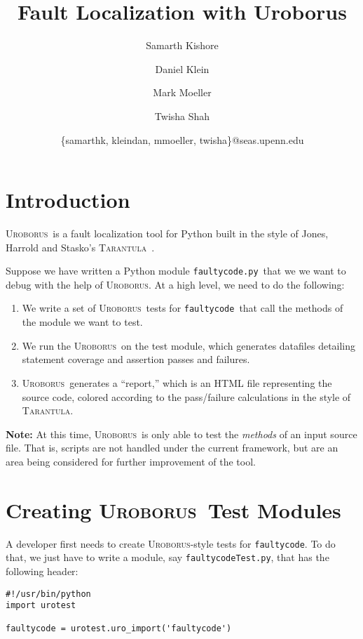 \documentclass[english]{article}
\title{Fault Localization with Uroborus}
\author{Samarth Kishore \and Daniel Klein \and Mark Moeller \and Twisha Shah \and
\{samarthk, kleindan, mmoeller, twisha\}@seas.upenn.edu}
\newcommand{\Uro}{\textsc{Uroborus}}
\newcommand{\Taran}{\textsc{Tarantula}}
\newcommand{\fc}{\texttt{faultycode}}
\newcommand{\fcp}{\texttt{faultycode.py}}
\newcommand{\fcT}{\texttt{faultycodeTest.py}}
\newcommand{\fcip}{\texttt{faultycode\_instrumented.py}}
\begin{document}
\maketitle


\section{Introduction}

\Uro\ is a fault localization tool for Python built in the style of Jones, Harrold and Stasko's
\Taran ~\cite{Jones}.

Suppose we have written a Python module \fcp\ that we we want to debug with the
help of \Uro. At a high level, we need to do the following:
\begin{enumerate}
\item We write a set of \Uro\ tests for \fc\ that call the methods of the module we want to test.
\item We run the \Uro\ on the test module, which generates datafiles detailing statement coverage and assertion
passes and failures.
\item \Uro\ generates a ``report,'' which is an HTML file representing the source code, colored according
to the pass/failure calculations in the style of \Taran.
\end{enumerate}
\textbf{Note:} At this time, \Uro\ is only able to test the \emph{methods} of an
input source file. That is, scripts are not handled under the current framework, but are an area being
considered for further improvement of the tool.





\section{Creating \Uro\ Test Modules}

A developer first needs to create \Uro-style tests for \fc. To do that, we just have to write a
module, say \fcT, that has the following header:\\
\begin{verbatim}
#!/usr/bin/python
import urotest

faultycode = urotest.uro_import('faultycode')
\end{verbatim}
\end{document}
